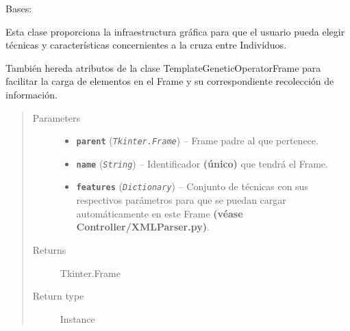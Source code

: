 \documentclass[letterpaper,10pt,english]{sphinxmanual}
\begin{document}
\begin{fulllineitems}
\label{View/Main/GeneticOperator/TemplateGeneticOperator/CrossoverFrame:View.Main.GeneticOperator.CrossoverFrame.CrossoverFrame}
Bases: {\hyperref[View/Main/GeneticOperator/TemplateGeneticOperator/TemplateGeneticOperatorFrame:View.Main.GeneticOperator.TemplateGeneticOperator.TemplateGeneticOperatorFrame.TemplateGeneticOperatorFrame]{}}

\begin{DUlineblock}{0em}
\item[] Esta clase proporciona la infraestructura gráfica para que el usuario pueda 
elegir técnicas y características concernientes a la cruza entre Individuos.
\item[] También hereda atributos de la clase TemplateGeneticOperatorFrame para facilitar
la carga de elementos en el Frame y su correspondiente recolección de información.
\end{DUlineblock}
\begin{quote}\begin{description}
\item[{Parameters}] \leavevmode\begin{itemize}
\item {} 
\textbf{\texttt{parent}} (\emph{\texttt{Tkinter.Frame}}) -- Frame padre al que pertenece.

\item {} 
\textbf{\texttt{name}} (\emph{\texttt{String}}) -- Identificador \textbf{(único)} que tendrá el Frame.

\item {} 
\textbf{\texttt{features}} (\emph{\texttt{Dictionary}}) -- Conjunto de técnicas con sus respectivos parámetros para que
se puedan cargar automáticamente en este Frame \textbf{(véase
Controller/XMLParser.py)}.

\end{itemize}

\item[{Returns}] \leavevmode
Tkinter.Frame

\item[{Return type}] \leavevmode
Instance

\end{description}\end{quote}


\end{fulllineitems}
\end{document}
